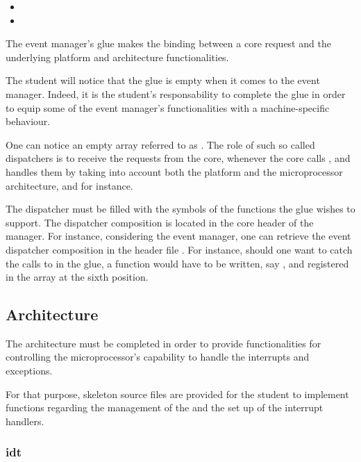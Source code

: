 \begin{itemize}
  \item
  \item
\end{itemize}

The event manager's glue makes the binding between a core request and the
underlying platform and architecture functionalities.

The student will notice that the glue is empty when it comes to the
event manager. Indeed, it is the student's responsability to complete the
glue in order to equip some of the event manager's functionalities with a
machine-specific behaviour.

One can notice an empty array referred to as .
The role of such so called dispatchers is to receive the requests from
the core, \ie{} whenever the core calls , and
handles them by taking into account both the platform and the microprocessor
architecture,  and  for instance.

The dispatcher must be filled with the symbols of the functions the
glue wishes to support. The dispatcher composition is located in the
core header of the manager. For instance, considering the event manager,
one can retrieve the event dispatcher composition  in
the header file . For instance,
should one want to catch the calls to  in
the glue, a function would have to be written, say
, and registered in the
 array at the sixth position.

\subsection{Architecture}

The architecture must be completed in order to provide functionalities for
controlling the microprocessor's capability to handle the interrupts and
exceptions.

For that purpose, skeleton source files are provided for the student to
implement functions regarding the management of the  and the set up of the interrupt handlers.

\subsubsection*{idt}

